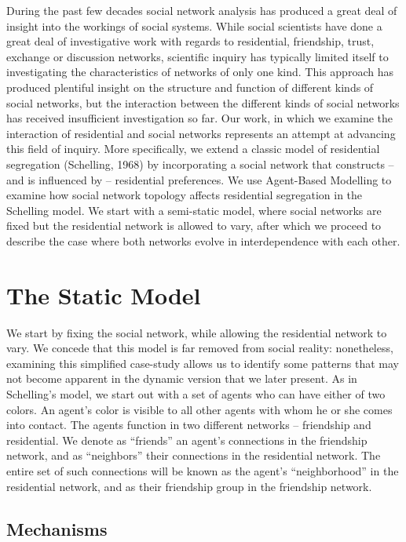 \documentclass[a4paper,10pt]{article}
\title{}
\author{}
\begin{document}
During the past few decades social network analysis has produced a great deal of insight into the workings of social systems. While social scientists have done a great deal of investigative work with regards to residential, friendship, trust, exchange or discussion networks, scientific inquiry has typically limited itself to investigating the characteristics of networks of only one kind. This approach has produced plentiful insight on the structure and function of different kinds of social networks, but the interaction between the different kinds of social networks has received insufficient investigation so far. Our work, in which we examine the interaction of residential and social networks represents an attempt at advancing this field of inquiry. More specifically, we extend a classic model of residential segregation (Schelling, 1968) by incorporating a social network that constructs -- and is influenced by -- residential preferences. We use Agent-Based Modelling to examine how social network topology affects residential segregation in the Schelling model. We start with a semi-static model, where social networks are fixed but the residential network is allowed to vary, after which we proceed to describe the case where both networks evolve in interdependence with each other. 

\section{The Static Model}

We start by fixing the social network, while allowing the residential network to vary. We concede that this model is far removed from social reality: nonetheless, examining this simplified case-study allows us to identify some patterns that may not become apparent in the dynamic version that we later present. As in Schelling's model, we start out with a set of agents who can have either of two colors. An agent's color is visible to all other agents with whom he or she comes into contact. The agents function in two different networks -- friendship and residential. We denote as ``friends'' an agent's connections in the friendship network, and as ``neighbors'' their connections in the residential network. The entire set of such connections will be known as the agent's ``neighborhood'' in the residential network, and as their friendship group in the friendship network. 

\subsection{Mechanisms}
\end{document}
